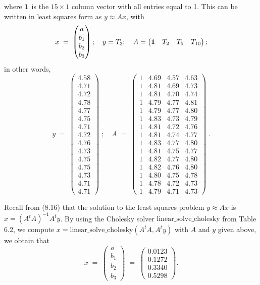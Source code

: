 where $\mathbf{1}$ is the $15 \times 1$ column vector with all entries equal to 1. This can
be written in least squares form as $y \approx Ax$, with
\[
x \;=\; \begin{pmatrix} a \\ b_1 \\ b_2 \\ b_3 \end{pmatrix}; \quad y = T_3; \quad
A = \begin{pmatrix} \mathbf{1} & T_2 & T_5 & T_{10} \end{pmatrix};
\]
in other words,
\[
y \;=\;
\begin{pmatrix}
4.58 \\ 4.71 \\ 4.72 \\ 4.78 \\ 4.77 \\ 4.75 \\ 4.71 \\ 4.72 \\ 4.76 \\ 4.73 \\ 4.75 \\
4.75 \\ 4.73 \\ 4.71 \\ 4.71
\end{pmatrix}
\;;
\quad
A \;=\;
\begin{pmatrix}
1 & 4.69 & 4.57 & 4.63 \\
1 & 4.81 & 4.69 & 4.73 \\
1 & 4.81 & 4.70 & 4.74 \\
1 & 4.79 & 4.77 & 4.81 \\
1 & 4.79 & 4.77 & 4.80 \\
1 & 4.83 & 4.73 & 4.79 \\
1 & 4.81 & 4.72 & 4.76 \\
1 & 4.81 & 4.74 & 4.77 \\
1 & 4.83 & 4.77 & 4.80 \\
1 & 4.81 & 4.75 & 4.77 \\
1 & 4.82 & 4.77 & 4.80 \\
1 & 4.82 & 4.76 & 4.80 \\
1 & 4.80 & 4.75 & 4.78 \\
1 & 4.78 & 4.72 & 4.73 \\
1 & 4.79 & 4.71 & 4.73
\end{pmatrix}
\;.
\]

Recall from (8.16) that the solution to the least squares problem $y \approx Ax$ is
$x = (A^tA)^{-1}A^ty$. By using the Cholesky solver $\text{linear\_solve\_cholesky}$
from Table 6.2, we compute $x = \text{linear\_solve\_cholesky}(A^tA,A^ty)$ with $A$ and
$y$ given above, we obtain that
\[
x \;=\; \begin{pmatrix} a \\ b_1 \\ b_2 \\ b_3 \end{pmatrix} \;=\; \begin{pmatrix}
0.0123 \\ 0.1272 \\ 0.3340 \\ 0.5298 \end{pmatrix}.
\]

